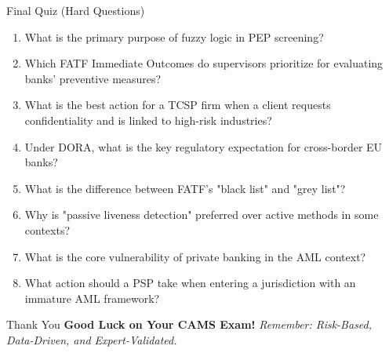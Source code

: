 \documentclass{beamer}
\renewcommand{\normalsize}{\fontsize{9}{11}\selectfont}
\begin{document}
	\begin{frame}{Final Quiz (Hard Questions)}
		\begin{enumerate}
			\item What is the primary purpose of fuzzy logic in PEP screening?
			\item Which FATF Immediate Outcomes do supervisors prioritize for evaluating banks' preventive measures?
			\item What is the best action for a TCSP firm when a client requests confidentiality and is linked to high-risk industries?
			\item Under DORA, what is the key regulatory expectation for cross-border EU banks?
			\item What is the difference between FATF's "black list" and "grey list"?
			\item Why is "passive liveness detection" preferred over active methods in some contexts?
			\item What is the core vulnerability of private banking in the AML context?
			\item What action should a PSP take when entering a jurisdiction with an immature AML framework?
		\end{enumerate}
	\end{frame}
	
	\begin{frame}
		\begin{center}
			\Huge Thank You
			\vspace{0.5cm}
			\Large \textbf{Good Luck on Your CAMS Exam!}
			\vspace{1cm}
			\normalsize \textit{Remember: Risk-Based, Data-Driven, and Expert-Validated.}
		\end{center}
	\end{frame}
	
\end{document}
